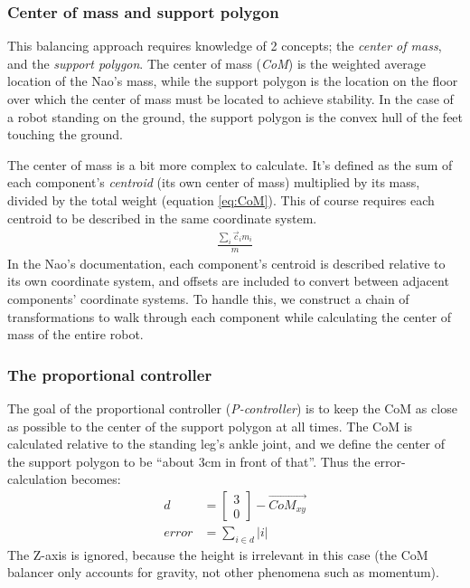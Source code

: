 \documentclass[a4paper]{article}
\begin{document}
\subsubsection{Center of mass and support polygon}
This balancing approach requires knowledge of 2 concepts; the \emph{center of mass},
and the \emph{support polygon}. The center of mass (\emph{CoM}) is the weighted average
location of the Nao’s mass, while the support polygon is the location on the
floor over which the center of mass must be located to achieve stability. In the
case of a robot standing on the ground, the support polygon is the convex hull
of the feet touching the ground.

The center of mass is a bit more complex to calculate. It's defined as the sum
of each component’s \emph{centroid} (its own center of mass) multiplied by its
mass, divided by the total weight (equation \ref{eq:CoM}). This of course
requires each centroid to be described in the same coordinate system.
\begin{align}
  \frac{\sum_i \vec{c}_i m_i} {m}        \label{eq:CoM}
\end{align}
In the Nao’s documentation, each component’s centroid is described relative to
its own coordinate system, and offsets are included to convert between adjacent
components’ coordinate systems. To handle this, we construct a chain of
transformations to walk through each component while calculating the center of
mass of the entire robot.

\subsubsection{The proportional controller}
The goal of the proportional controller (\emph{P-controller}) is to keep the
CoM as close as possible to the center of the support polygon at all times.
The CoM is calculated relative to the standing leg's ankle joint, and we define
the center of the support polygon to be ``about 3cm in front of that''. Thus the
error-calculation becomes:
\begin{align}
	d &= \begin{bmatrix} 3 \\ 0 \end{bmatrix} - \vec{CoM_{xy}} \\
	error &= \sum_{i \in d} |i|
\end{align}
The Z-axis is ignored, because the height is irrelevant in this case (the CoM
balancer only accounts for gravity, not other phenomena such as momentum).
\end{document}
